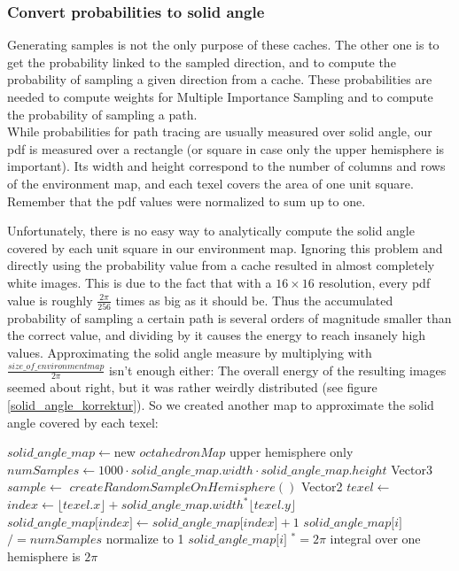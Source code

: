 \newpage
\subsubsection{Convert probabilities to solid angle}
\label{solidAngleConversion}
Generating samples is not the only purpose of these caches. The other one is to get the probability linked to the sampled direction, and to compute the probability of sampling a given direction from a cache. These probabilities are needed to compute weights for Multiple Importance Sampling and to compute the probability of sampling a path.\\
While probabilities for path tracing are usually measured over solid angle, our pdf is measured over a rectangle (or square in case only the upper hemisphere is important). Its width and height correspond to the number of columns and rows of the environment map, and each texel covers the area of one unit square. Remember that the pdf values were normalized to sum up to one.

Unfortunately, there is no easy way to analytically compute the solid angle covered by each unit square in our environment map. Ignoring this problem and directly using the probability value from a cache resulted in almost completely white images. This is due to the fact that with a $16\times 16$ resolution, every pdf value is roughly $\frac{2\pi}{256}$ times as big as it should be. Thus the accumulated probability of sampling a certain path is several orders of magnitude smaller than the correct value, and dividing by it causes the energy to reach insanely high values.\newline
Approximating the solid angle measure by multiplying with $\frac{size\_of\_environmentmap}{2\pi}$ isn't enough either: The overall energy of the resulting images seemed about right, but it was rather weirdly distributed (see figure \ref{solid_angle_korrektur}). So we created another map to approximate the solid angle covered by each texel:
\newline
\begin{algorithmic}
\State $solid\_angle\_map \gets $new $octahedronMap$ \Comment upper hemisphere only
\State $numSamples \gets 1000 \cdot solid\_angle\_map.width \cdot solid\_angle\_map.height$
	\State Vector3 $sample \gets $ $createRandomSampleOnHemisphere()$
	\State Vector2 $texel \gets $
	\State $index \gets \lfloor texel.x \rfloor + solid\_angle\_map.width ^* \lfloor texel.y \rfloor$
	\State $solid\_angle\_map\lbrack index \rbrack \gets solid\_angle\_map\lbrack index \rbrack + 1$
\EndFor
{}
	\State $solid\_angle\_map\lbrack i \rbrack$ $/=numSamples$ \Comment normalize to 1
	\State $solid\_angle\_map\lbrack i \rbrack$ $^*= 2\pi$ \Comment integral over one hemisphere is $2\pi$
\EndFor
\end{algorithmic}

